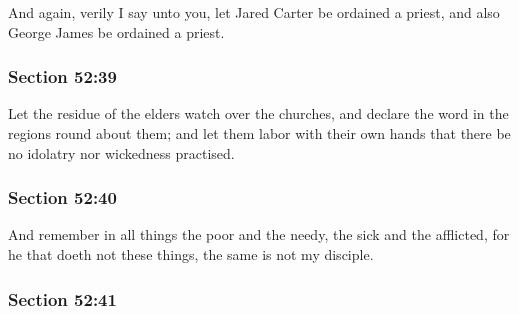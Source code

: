 		And again, verily I say unto you, let Jared Carter be ordained a priest, and also George James be ordained a priest.


	\subsubsection{Section 52:39} %
		\label{DC52-39}

		Let the residue of the elders watch over the churches, and declare the word in the regions round about them; and let them labor with their own hands that there be no idolatry nor wickedness practised.


	\subsubsection{Section 52:40} %
		\label{DC52-40}

		And remember in all things the poor and the needy, the sick and the afflicted, for he that doeth not these things, the same is not my disciple.


	\subsubsection{Section 52:41} %
		\label{DC52-41}

